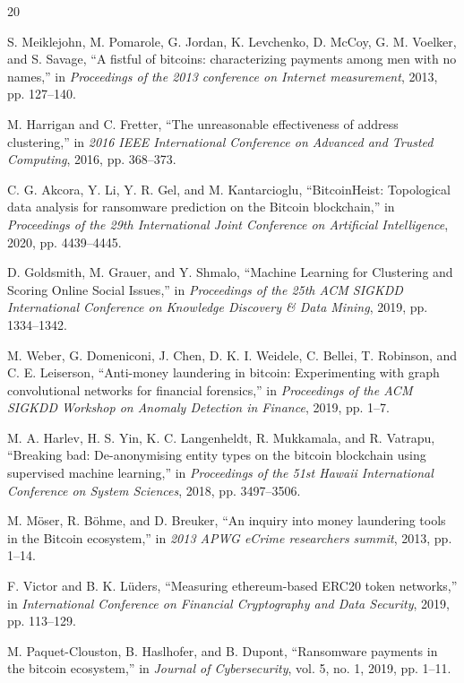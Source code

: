 \documentclass[conference]{IEEEtran}
\begin{document}

\begin{thebibliography}{20}

S. Meiklejohn, M. Pomarole, G. Jordan, K. Levchenko, D. McCoy, G. M. Voelker, and S. Savage, ``A fistful of bitcoins: characterizing payments among men with no names,'' in \emph{Proceedings of the 2013 conference on Internet measurement}, 2013, pp. 127--140.

M. Harrigan and C. Fretter, ``The unreasonable effectiveness of address clustering,'' in \emph{2016 IEEE International Conference on Advanced and Trusted Computing}, 2016, pp. 368--373.

C. G. Akcora, Y. Li, Y. R. Gel, and M. Kantarcioglu, ``BitcoinHeist: Topological data analysis for ransomware prediction on the Bitcoin blockchain,'' in \emph{Proceedings of the 29th International Joint Conference on Artificial Intelligence}, 2020, pp. 4439--4445.

D. Goldsmith, M. Grauer, and Y. Shmalo, ``Machine Learning for Clustering and Scoring Online Social Issues,'' in \emph{Proceedings of the 25th ACM SIGKDD International Conference on Knowledge Discovery \& Data Mining}, 2019, pp. 1334--1342.

M. Weber, G. Domeniconi, J. Chen, D. K. I. Weidele, C. Bellei, T. Robinson, and C. E. Leiserson, ``Anti-money laundering in bitcoin: Experimenting with graph convolutional networks for financial forensics,'' in \emph{Proceedings of the ACM SIGKDD Workshop on Anomaly Detection in Finance}, 2019, pp. 1--7.

M. A. Harlev, H. S. Yin, K. C. Langenheldt, R. Mukkamala, and R. Vatrapu, ``Breaking bad: De-anonymising entity types on the bitcoin blockchain using supervised machine learning,'' in \emph{Proceedings of the 51st Hawaii International Conference on System Sciences}, 2018, pp. 3497--3506.

M. Möser, R. Böhme, and D. Breuker, ``An inquiry into money laundering tools in the Bitcoin ecosystem,'' in \emph{2013 APWG eCrime researchers summit}, 2013, pp. 1--14.

F. Victor and B. K. Lüders, ``Measuring ethereum-based ERC20 token networks,'' in \emph{International Conference on Financial Cryptography and Data Security}, 2019, pp. 113--129.

M. Paquet-Clouston, B. Haslhofer, and B. Dupont, ``Ransomware payments in the bitcoin ecosystem,'' in \emph{Journal of Cybersecurity}, vol. 5, no. 1, 2019, pp. 1--11.


\end{thebibliography}
\end{document}
